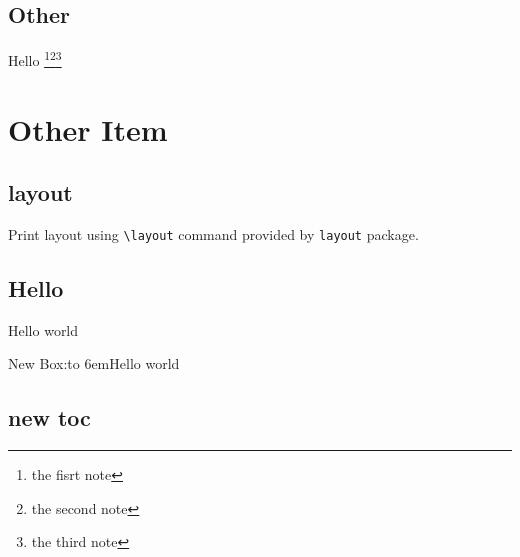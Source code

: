 \documentclass[
  class=book,
  mathSpec={envStyle=paris},
  layout={slide, aspect=16|9},
]{zlatex}
\begin{document}
\section*{Other}
\contentsname

Hello \footnote[1]{the fisrt note}\footnote[2]{the second note}\footnote[3]{the third note}

\chapter*{Other Item}
\section{layout}
\lipsum[2]
Print layout using \verb|\layout| command provided by \texttt{layout} package.


\section{Hello}
Hello world \pageref{zslide-last-page}

New Box:\hbox to 6em{Hello\hfill} world

\section{new toc}
\end{document}
